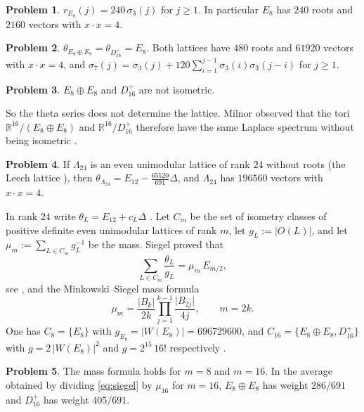\documentclass[reqno]{amsart}
\theoremstyle{definition}
\newtheorem{problem}{Problem}[section]
\theoremstyle{plain}
\newcommand{\R}{\mathbb{R}}
\begin{document}
\begin{problem}\label{pr:E8}
\(r_{E_8}(j) = 240\,\sigma_3(j)\) for \(j \ge 1\).  In particular \(E_8\) has \(240\) roots and \(2160\) vectors with \(x \cdot x = 4\).
\end{problem}

\begin{problem}\label{pr:rank16}
\(\theta_{E_8 \oplus E_8} = \theta_{D_{16}^+} = E_8\).  Both lattices have \(480\) roots and \(61920\) vectors with \(x\cdot x = 4\), and \(\sigma_7(j) = \sigma_3(j) + 120\sum_{i=1}^{j-1}\sigma_3(i)\sigma_3(j-i)\) for \(j\ge1\).
\end{problem}

\begin{problem}\label{pr:not-iso}
\(E_8 \oplus E_8\) and \(D_{16}^+\) are not isometric.
\end{problem}

So the theta series does not determine the lattice.  Milnor observed that the tori \(\R^{16}/(E_8\oplus E_8)\) and \(\R^{16}/D_{16}^+\) therefore have the same Laplace spectrum without being isometric \cite{Mi}.

\begin{problem}\label{pr:leech}
If \(\Lambda_{24}\) is an even unimodular lattice of rank \(24\) without roots (the Leech lattice \cite[Ch.~4, \S11]{CoS}), then \(\theta_{\Lambda_{24}} = E_{12} - \frac{65520}{691}\Delta\), and \(\Lambda_{24}\) has \(196560\) vectors with \(x\cdot x = 4\).
\end{problem}

In rank \(24\) write \(\theta_L=E_{12}+c_L\Delta\) \cite[Ch.~VII, \S6.6]{SeA}.  Let \(C_m\) be the set of isometry classes of positive definite even unimodular lattices of rank \(m\), let \(g_L := \lvert O(L) \rvert\), and let \(\mu_m := \sum_{L \in C_m} g_L^{-1}\) be the mass.  Siegel proved \cite{Si} that
\begin{equation}\label{eq:siegel}
  \sum_{L \in C_m} \frac{\theta_L}{g_L} = \mu_m\, E_{m/2},
\end{equation}
see \cite[Ch.~VII, \S6.5, Remark]{SeA}, and the Minkowski--Siegel mass formula \cite[Ch.~V, \S2.3]{SeA}
\[
  \mu_m = \frac{\lvert B_{k}\rvert}{2k} \prod_{j=1}^{k-1} \frac{\lvert B_{2j}\rvert}{4j}, \qquad m = 2k .
\]
One has \(C_8 = \{E_8\}\) with \(g_{E_8} = \lvert W(E_8)\rvert = 696729600\), and \(C_{16} = \{E_8 \oplus E_8, D_{16}^+\}\) with \(g = 2\,\lvert W(E_8)\rvert^2\) and \(g = 2^{15}\,16!\) respectively \cite[Ch.~V, \S2.3]{SeA}.

\begin{problem}\label{pr:mass}
The mass formula holds for \(m = 8\) and \(m = 16\).  In the average obtained by dividing \eqref{eq:siegel} by \(\mu_{16}\) for \(m=16\), \(E_8 \oplus E_8\) has weight \(286/691\) and \(D_{16}^+\) has weight \(405/691\).
\end{problem}
\end{document}
